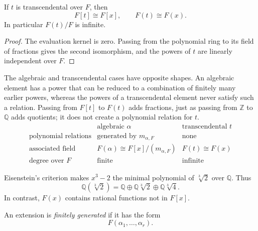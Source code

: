 \begin{proposition}
If \(t\) is transcendental over \(F\), then
\[
F[t]\cong F[x],
\qquad
F(t)\cong F(x).
\]
In particular \(F(t)/F\) is infinite.
\end{proposition}
\begin{proof}
The evaluation kernel is zero.  Passing from the polynomial ring to its
field of fractions gives the second isomorphism, and the powers of \(t\) are
linearly independent over \(F\).
\end{proof}

The algebraic and transcendental cases have opposite shapes.  An algebraic
element has a power that can be reduced to a combination of finitely many
earlier powers, whereas the powers of a transcendental element never satisfy
such a relation.  Passing from \(F[t]\) to \(F(t)\) adds fractions, just as
passing from \(\mathbb Z\) to \(\mathbb Q\) adds quotients; it does not create
a polynomial relation for \(t\).
\[
\begin{array}{c|c|c}
& \text{algebraic }\alpha & \text{transcendental }t\\ \hline
\text{polynomial relations} & \text{generated by }m_{\alpha,F} & \text{none}\\
\text{associated field} & F(\alpha)\cong F[x]/(m_{\alpha,F}) & F(t)\cong F(x)\\
\text{degree over }F & \text{finite} & \text{infinite}
\end{array}
\]

\begin{example}
Eisenstein's criterion makes \(x^3-2\) the minimal polynomial of
\(\sqrt[3]2\) over \(\mathbb Q\).  Thus
\[
\mathbb Q(\sqrt[3]2)
=\mathbb Q\oplus\mathbb Q\sqrt[3]2\oplus\mathbb Q\sqrt[3]4.
\]
In contrast, \(F(x)\) contains rational functions not in \(F[x]\).
\end{example}

\begin{definition}
An extension is \emph{finitely generated} if it has the form
\[
F(\alpha_1,\ldots,\alpha_r).
\]
\end{definition}

